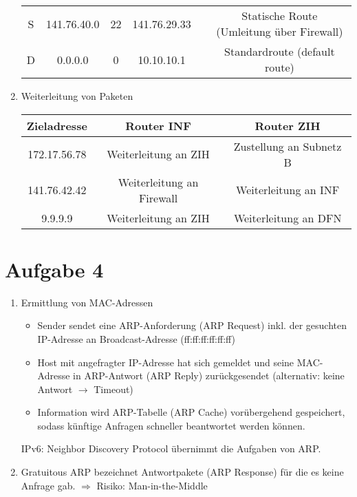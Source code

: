 \documentclass{article}
\begin{document}
\begin{enumerate}[label=(\alph*)]
\begin{center}
\begin{tabular}{c|cc|c|c|c}
				S & 141.76.40.0 & 22 & 141.76.29.33 & & Statische Route (Umleitung über Firewall) \\
				D & 0.0.0.0 & 0 & 10.10.10.1 & & Standardroute (default route)
			\end{tabular}
		\end{center}
		\item Weiterleitung von Paketen
		\begin{center}
			\begin{tabular}{c|c|c}
				\textbf{Zieladresse} & \textbf{Router INF} & \textbf{Router ZIH} \\
				\hline
				172.17.56.78 & Weiterleitung an ZIH & Zustellung an Subnetz B \\
				141.76.42.42 & Weiterleitung an Firewall & Weiterleitung an INF \\
				9.9.9.9 & Weiterleitung an ZIH & Weiterleitung an DFN
			\end{tabular}
		\end{center}
	\end{enumerate}

	\section*{Aufgabe 4}
	\begin{enumerate}[label=(\alph*)]
		\item Ermittlung von MAC-Adressen
		\begin{itemize}
			\item Sender sendet eine ARP-Anforderung (ARP Request) inkl. der gesuchten IP-Adresse an Broadcast-Adresse (ff:ff:ff:ff:ff:ff)
			\item Host mit angefragter IP-Adresse hat sich gemeldet und seine MAC-Adresse in ARP-Antwort (ARP Reply) zurückgesendet (alternativ: keine Antwort $\to$ Timeout)
			\item Information wird ARP-Tabelle (ARP Cache) vorübergehend gespeichert, sodass künftige Anfragen schneller beantwortet werden können.
		\end{itemize}
		IPv6: Neighbor Discovery Protocol übernimmt die Aufgaben von ARP.
		\item Gratuitous ARP bezeichnet Antwortpakete (ARP Response) für die es keine Anfrage gab. $\Rightarrow$ Risiko: Man-in-the-Middle
	\end{enumerate}
\end{document}
